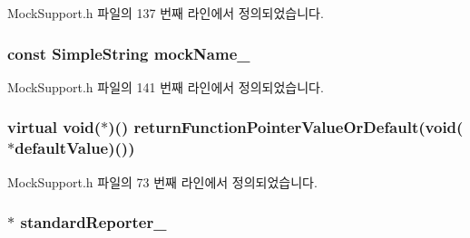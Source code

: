 Mock\+Support.\+h 파일의 137 번째 라인에서 정의되었습니다.

\subsubsection[{\texorpdfstring{mock\+Name\+\_\+}{mockName_}}]{\setlength{\rightskip}{0pt plus 5cm}const {\bf Simple\+String} mock\+Name\+\_\+\hspace{0.3cm}{\ttfamily [private]}}\hypertarget{class_mock_support_a4ab891b797dea40dc832515765d4ab3e}{}\label{class_mock_support_a4ab891b797dea40dc832515765d4ab3e}


Mock\+Support.\+h 파일의 141 번째 라인에서 정의되었습니다.

\subsubsection[{\texorpdfstring{return\+Function\+Pointer\+Value\+Or\+Default}{returnFunctionPointerValueOrDefault}}]{\setlength{\rightskip}{0pt plus 5cm}virtual void($\ast$)() return\+Function\+Pointer\+Value\+Or\+Default(void($\ast$default\+Value)())}\hypertarget{class_mock_support_aaccaf7aaf2fab5a0a747af7db552bbfd}{}\label{class_mock_support_aaccaf7aaf2fab5a0a747af7db552bbfd}


Mock\+Support.\+h 파일의 73 번째 라인에서 정의되었습니다.

\subsubsection[{\texorpdfstring{standard\+Reporter\+\_\+}{standardReporter_}}]{$\ast$ standard\+Reporter\+\_\+\hspace{0.3cm}{\ttfamily [private]}}\hypertarget{class_mock_support_a6df54f7f57d625cc6c06c838e37c76c0}{}\label{class_mock_support_a6df54f7f57d625cc6c06c838e37c76c0}


